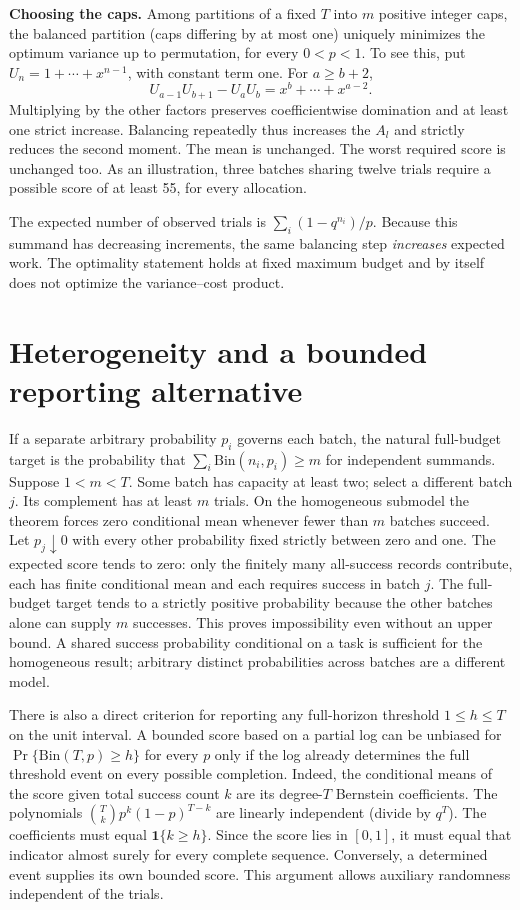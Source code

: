 \documentclass[11pt]{article}
\begin{document}
\textbf{Choosing the caps.} Among partitions of a fixed $T$ into $m$ positive integer caps, the balanced partition (caps differing by at most one) uniquely minimizes the optimum variance up to permutation, for every $0<p<1$. To see this, put $U_n=1+\cdots+x^{n-1}$, with constant term one. For $a\ge b+2$,
\[
 U_{a-1}U_{b+1}-U_a U_b=x^b+\cdots+x^{a-2}.
\]
Multiplying by the other factors preserves coefficientwise domination and at least one strict increase. Balancing repeatedly thus increases the $A_l$ and strictly reduces the second moment. The mean is unchanged. The worst required score is unchanged too. As an illustration, three batches sharing twelve trials require a possible score of at least 55, for every allocation.

The expected number of observed trials is $\sum_i(1-q^{n_i})/p$. Because this summand has decreasing increments, the same balancing step \emph{increases} expected work. The optimality statement holds at fixed maximum budget and by itself does not optimize the variance--cost product.

\newpage
\section*{Heterogeneity and a bounded reporting alternative}
If a separate arbitrary probability $p_i$ governs each batch, the natural full-budget target is the probability that $\sum_i\mathrm{Bin}(n_i,p_i)\ge m$ for independent summands. Suppose $1<m<T$. Some batch has capacity at least two; select a different batch $j$. Its complement has at least $m$ trials. On the homogeneous submodel the theorem forces zero conditional mean whenever fewer than $m$ batches succeed. Let $p_j\downarrow0$ with every other probability fixed strictly between zero and one. The expected score tends to zero: only the finitely many all-success records contribute, each has finite conditional mean and each requires success in batch $j$. The full-budget target tends to a strictly positive probability because the other batches alone can supply $m$ successes. This proves impossibility even without an upper bound. A shared success probability conditional on a task is sufficient for the homogeneous result; arbitrary distinct probabilities across batches are a different model.

There is also a direct criterion for reporting any full-horizon threshold $1\le h\le T$ on the unit interval. A bounded score based on a partial log can be unbiased for $\Pr\{\mathrm{Bin}(T,p)\ge h\}$ for every $p$ only if the log already determines the full threshold event on every possible completion. Indeed, the conditional means of the score given total success count $k$ are its degree-$T$ Bernstein coefficients. The polynomials $\binom{T}{k}p^k(1-p)^{T-k}$ are linearly independent (divide by $q^T$). The coefficients must equal $\mathbf 1\{k\ge h\}$. Since the score lies in $[0,1]$, it must equal that indicator almost surely for every complete sequence. Conversely, a determined event supplies its own bounded score. This argument allows auxiliary randomness independent of the trials.
\end{document}

